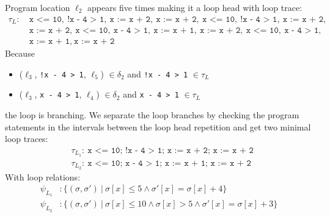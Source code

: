 \documentclass{article}
\begin{document}
\begin{figure}[H]
\end{figure}
Program location $\ell_2$ appears five times making it a loop head with loop trace:
\begin{align*}
    \tau_L:\ &\texttt{x <= 10},\ \texttt{!x - 4 > 1},\ \texttt{x := x + 2},\ \texttt{x := x + 2},\ \texttt{x <= 10},\ \texttt{!x - 4 > 1},\ \texttt{x := x + 2},\ \\ &\texttt{x := x + 2},\ \texttt{x <= 10},\ \texttt{x - 4 > 1},\ \texttt{x := x + 1},\ \texttt{x := x + 2},\ \texttt{x <= 10},\ \texttt{x - 4 > 1},\ \\ &\texttt{x := x + 1},\ \texttt{x := x + 2}
\end{align*}
Because \begin{itemize}
    \item ($\ell_3$, \texttt{!x - 4 > 1}, $\ell_5$) $\in \delta_2$ and \texttt{!x - 4 > 1} $\in \tau_L$
    \item ($\ell_3$, \texttt{x - 4 > 1}, $\ell_4$) $\in \delta_2$ and \texttt{x - 4 > 1} $\in \tau_L$
\end{itemize}
the loop is branching.
We separate the loop branches by checking the program statements in the intervals between the loop head repetition and get two minimal loop traces:
\begin{align*}
    &\tau_{L_1}:\ \texttt{x <= 10; !x - 4 > 1; x := x + 2;\ x := x + 2} \\
    &\tau_{L_2}:\ \texttt{x <= 10; x - 4 > 1; x := x + 1; x := x + 2}
\end{align*}
With loop relations:
\begin{align*}
    \psi_{L_{1}} &: \{(\sigma, \sigma')\ |\ \sigma[x] \leq 5 \land  \sigma'[x] = \sigma[x] + 4 \} \\
    \psi_{L_{2}}&: \{(\sigma, \sigma')\ |\ \sigma[x] \leq 10 \land \sigma[x] > 5 \land  \sigma'[x] = \sigma[x] + 3 \}
\end{align*}
\end{document}
